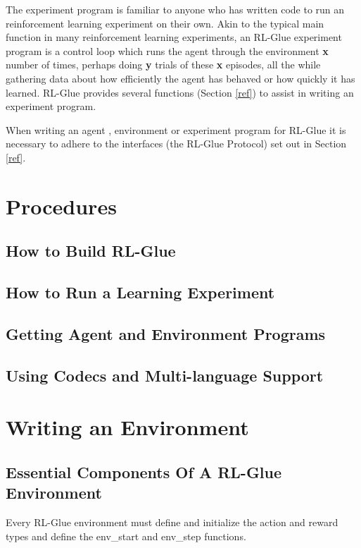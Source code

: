\documentclass[11pt]{article}
\begin{document}
The experiment program is familiar to anyone who has written code to run an reinforcement learning experiment on their own. Akin to the typical main function in many reinforcement learning experiments, an RL-Glue experiment program is a control loop which runs the agent through the environment {\bf x} number of times, perhaps doing {\bf y} trials of these {\bf x} episodes, all the while gathering data about how efficiently the agent has behaved or how quickly it has learned. RL-Glue provides several functions (Section \ref{ref}) to assist in writing an experiment program.


When writing an agent , environment or experiment program for RL-Glue it is necessary to adhere to the interfaces (the RL-Glue Protocol) set out in Section \ref{ref}. 

\section{Procedures}
\subsection{How to Build RL-Glue}
\subsection{How to Run a Learning Experiment}
\label{quick}

\subsection{Getting Agent and Environment Programs}
\subsection{Using Codecs and Multi-language Support}


\section{Writing an Environment}
\label{env}


\subsection{Essential Components Of A RL-Glue Environment}
\label{envp1}

Every RL-Glue environment must define and initialize the action and reward types and define the env\_start and env\_step functions.   
\end{document}
